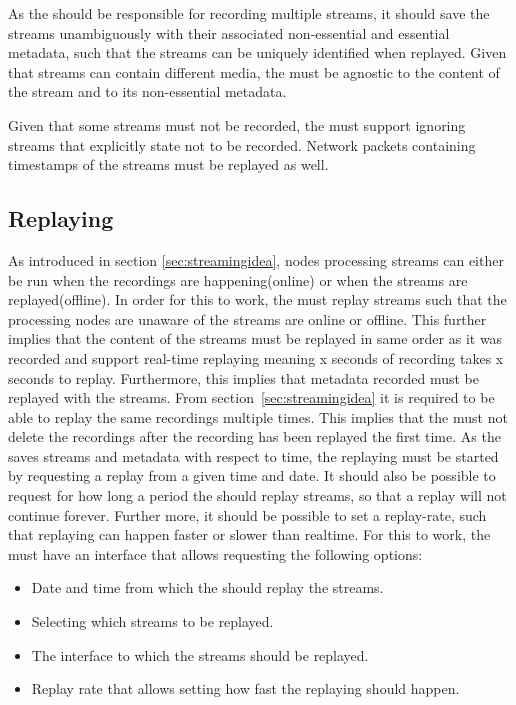 As the \hist{} should be responsible for recording multiple streams, it should save the streams unambiguously with their associated non-essential and essential metadata, such that the streams can be uniquely identified when replayed.
Given that streams can contain different media, the \hist{} must be agnostic to the content of the stream and to its non-essential metadata.

Given that some streams must not be recorded, the  must support ignoring streams that explicitly state not to be recorded. Network packets containing timestamps of the streams must be replayed as well.


\subsection{Replaying}
As introduced in section \ref{sec:streamingidea}, nodes processing streams can either be run when the recordings are happening(online) or when the streams are replayed(offline). In order for this to work, the  must replay streams such that the processing nodes are unaware of the streams are online or offline. This further implies that the content of the streams must be replayed in same order as it was recorded and support real-time replaying meaning x seconds of recording takes x seconds to replay. Furthermore, this implies that metadata recorded must be replayed with the streams. From section~\ref{sec:streamingidea} it is required to be able to replay the same recordings multiple times. This implies that the  must not delete the recordings after the recording has been replayed the first time.
As the  saves streams and metadata with respect to time, the replaying must be started by requesting a replay from a given time and date. It should also be possible to request for how long a period the  should replay streams, so that a replay will not continue forever.
Further more, it should be possible to set a replay-rate, such that replaying can happen faster or slower than realtime. For this to work, the  must have an interface that allows requesting the following options:

\begin{itemize}
	\item Date and time from which the  should replay the streams.
	\item Selecting which streams to be replayed.
	\item The interface to which the streams should be replayed.
	\item Replay rate that allows setting how fast the replaying should happen. 
\end{itemize}

